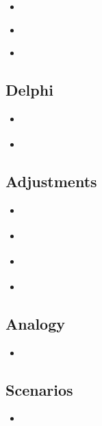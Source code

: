 \documentclass[]{book}
\providecommand{\tightlist}{%
  \setlength{\itemsep}{0pt}\setlength{\parskip}{0pt}}
\begin{document}
\begin{itemize}
\tightlist
\item
  \citet{Fildes2007a}
\item
  \citet{Fildes2007}
\item
  \citet{Harvey2001}
\end{itemize}

\hypertarget{delphi}{%
\subsection*{Delphi}\label{delphi}}

\begin{itemize}
\tightlist
\item
  \citet{RW99}
\item
  \citet{Rowe2007}
\end{itemize}

\hypertarget{adjustments}{%
\subsection*{Adjustments}\label{adjustments}}

\begin{itemize}
\tightlist
\item
  \citet{Sanders2005}
\item
  \citet{Eroglu2010}
\item
  \citet{Franses2013}
\item
  \citet{Goodwin00}
\end{itemize}

\hypertarget{analogy}{%
\subsection*{Analogy}\label{analogy}}

\begin{itemize}
\tightlist
\item
  \citet{Green2007}
\end{itemize}

\hypertarget{scenarios}{%
\subsection*{Scenarios}\label{scenarios}}

\begin{itemize}
\tightlist
\item
  \citet{Onkal2012}
\end{itemize}
\end{document}
